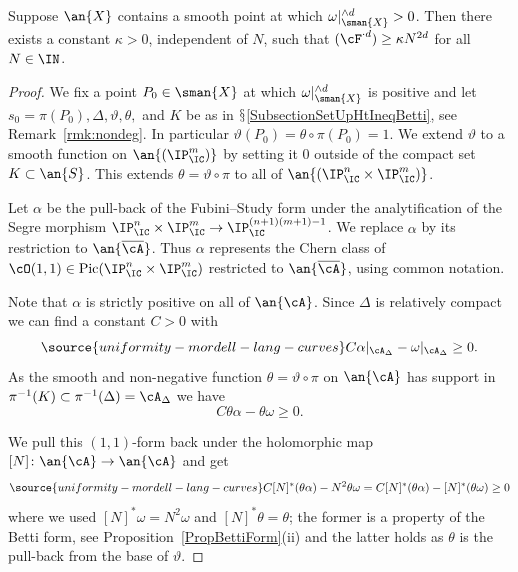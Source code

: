 \begin{proposition}
\notready
  \label{prop:intersectionlb}
  Suppose $\an{X}$ contains a smooth point at which
  $\omega|_{\sman{X}}^{\wedge d} >0$. Then there exists a constant $\kappa
  > 0$, independent of $N$, such that $(\cF^{\cdot d}) \ge \kappa N^{2d}$ for all
  $N\in\IN$.
\end{proposition}
\begin{proof}
We fix a point  $P_0 \in \sman{X}$ at which
$\omega|_{\sman{X}}^{\wedge d}$ is positive and let $s_0=\pi(P_0),\Delta,\vartheta,\theta,$
and $K$  be as in $\mathsection$\ref{SubsectionSetUpHtIneqBetti}, see
Remark~\ref{rmk:nondeg}. In particular $\vartheta(P_0) = \theta\circ \pi(P_0) = 1$.
We extend $\vartheta$ to a smooth function on  $\an{(\IP^m_\IC)}$ by
setting it $0$ outside of the compact set $K\subset \an{S}$. This
extends $\theta = \vartheta\circ\pi$ to all of
$\an{(\IP^n_\IC\times\IP^m_\IC)}$.

Let $\alpha$ be the pull-back of the Fubini--Study form
 under the analytification of the Segre morphism
$\IP_{\IC}^n\times\IP_{\IC}^m \rightarrow \IP_{\IC}^{(n+1)(m+1)-1}$.
We replace $\alpha$ by its restriction to $\an{\overline\cA}$.
Thus $\alpha$
represents the Chern class of
$\cO(1,1) \in \mathrm{Pic}(\IP^n_{\IC}\times\IP_{\IC}^m)$ restricted
 to $\an{\overline\cA}$, using common notation.

Note that $\alpha$ is strictly positive on all of
$\an{\cA}$.  Since $\Delta$ is relatively compact we can find a constant $C>0$
with
\begin{equation}\label{EqConditionOnCapitalC}
\source{uniformity-mordell-lang-curves}
 C \alpha|_{\cA_{\Delta}} - \omega|_{\cA_{\Delta}} \ge 0.
\end{equation}
As the smooth and non-negative function $\theta = \vartheta\circ\pi$ on $\an{\cA}$ has support in
$\pi^{-1}(K)\subset \pi^{-1}(\Delta)=\cA_{\Delta}$ we have
\begin{equation*}
  C \theta\alpha - \theta\omega \ge 0.
\end{equation*}

We pull this $(1,1)$-form back under the holomorphic map
$[N]\colon \an{\cA}\rightarrow\an{\cA}$ and get
\begin{equation}
\label{eq:pbsemipositive}
\source{uniformity-mordell-lang-curves}
C  [N]^* (\theta\alpha) - N^2\theta\omega =  C [N]^*(\theta\alpha) - [N]^*(\theta\omega)\ge 0
\end{equation}
where we used $[N]^*\omega = N^2\omega$ and $[N]^* \theta = \theta$;
the former is a property of the Betti form, see
Proposition~\ref{PropBettiForm}(ii) and
the latter holds as $\theta$ is the pull-back from the base of $\vartheta$.


\end{proof}
